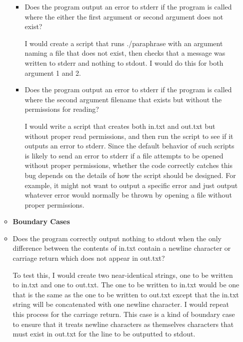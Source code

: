 \documentclass[11pt,letterpaper]{article}
\begin{document}
\begin{enumerate}[label=\arabic*.]
\begin{itemize}
\begin{itemize}
          \item Does the program output an error to stderr if the program is
            called where the either the first argument or second argument
            does not exist? 

            I would create a script that runs ./paraphrase with an argument naming a file 
            that does not exist, then checks that a message was written to stderr and
            nothing to stdout. I would do this for both argument 1 and 2.

          \item Does the program output an error to stderr if the program is
            called where the second argument filename that exists but without
            the permissions for reading? 

            I would write a script that creates both in.txt and out.txt but 
            without proper read permissions, and then run the script to see if it
            outputs an error to stderr. Since the default behavior of such scripts
            is likely to send an error to stderr if a file attempts to be opened
            without proper permissions, whether the code correctly catches this
            bug depends on the details of how the script should be designed. 
            For example, it might not want to output a specific error and just 
            output whatever error would normally be thrown by opening a file
            without proper permissions. 


        \end{itemize} 
      
      \item \textbf{Boundary Cases}

        \item Does the program correctly output nothing to stdout when
          the only difference between the contents of in.txt contain
          a newline character or carriage return which does not appear in
          out.txt?

              To test this, I would create two near-identical strings, one
              to be written to in.txt and one to out.txt. The one to be
              written to in.txt would be one that is the same as the one
              to be written to out.txt except that the in.txt string will
              be concatenated with one newline character. I would repeat
              this process for the carriage return. This case is a kind of
              boundary case to ensure that it treats newline characters
              as themselves characters that must exist in out.txt 
              for the line to be outputted to stdout. 


\end{itemize}
\end{enumerate}
\end{document}
